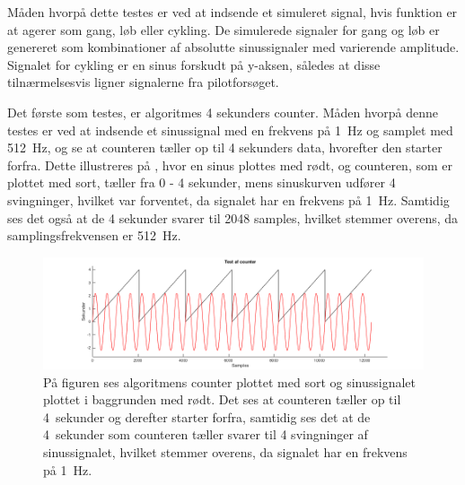 Måden hvorpå dette testes er ved at indsende et simuleret signal, hvis funktion er at agerer som gang, løb eller cykling. De simulerede signaler for gang og løb er genereret som kombinationer af absolutte sinussignaler med varierende amplitude. Signalet for cykling er en sinus forskudt på y-aksen, således at disse tilnærmelsesvis ligner signalerne fra pilotforsøget.

Det første som testes, er algoritmes 4 sekunders counter. Måden hvorpå denne testes er ved at indsende et sinussignal med en frekvens på 1~Hz og samplet med 512~Hz, og se at counteren tæller op til 4 sekunders data, hvorefter den starter forfra. Dette illustreres på , hvor en sinus plottes med rødt, og counteren, som er plottet med sort, tæller fra 0 - 4 sekunder, mens sinuskurven udfører 4 svingninger, hvilket var forventet, da signalet har en frekvens på 1~Hz. Samtidig ses det også at de 4 sekunder svarer til 2048 samples, hvilket stemmer overens, da samplingsfrekvensen er 512~Hz. 

\begin{figure}[H]
	\centering
	\includegraphics[width=1.0\textwidth]{figures/cDesign/sim_count_sinus.png}
	\caption{På figuren ses algoritmens counter plottet med sort og sinussignalet plottet i baggrunden med rødt. Det ses at counteren tæller op til 4~sekunder og derefter starter forfra, samtidig ses det at de 4~sekunder som counteren tæller svarer til 4 svingninger af sinussignalet, hvilket stemmer overens, da signalet har en frekvens på 1~Hz.}
	\label{fig:sim_count}
\end{figure}


